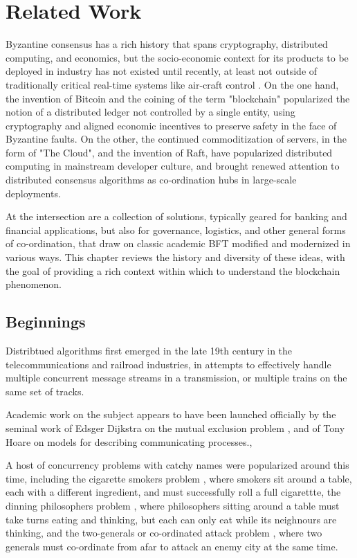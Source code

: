 \chapter{Related Work}
\label{ch:related}

Byzantine consensus has a rich history that spans cryptography, distributed computing, and economics,
but the socio-economic context for its products to be deployed in industry has not existed until recently,
at least not outside of traditionally critical real-time systems like air-craft control \cite{draper_lab}.
On the one hand, the invention of Bitcoin and the coining of the term "blockchain" popularized the notion
of a distributed ledger not controlled by a single entity, using cryptography and aligned economic incentives to 
preserve safety in the face of Byzantine faults.
On the other, the continued commoditization of servers, in the form of "The Cloud", and the invention of Raft, 
have popularized distributed computing in mainstream developer culture, 
and brought renewed attention to distributed consensus algorithms as co-ordination hubs in large-scale deployments. 

At the intersection are a collection of solutions, typically geared for banking and financial applications,
but also for governance, logistics, and other general forms of co-ordination, 
that draw on classic academic BFT modified and modernized in various ways.
This chapter reviews the history and diversity of these ideas, with the goal of providing a rich context within which to 
understand the blockchain phenomenon.

\section{Beginnings}

Distribtued algorithms first emerged in the late 19th century in the telecommunications and railroad industries,
in attempts to effectively handle multiple concurrent message streams in a transmission, 
or multiple trains on the same set of tracks.

Academic work on the subject appears to have been launched officially by the seminal work
of Edsger Dijkstra on the mutual exclusion problem \cite{mutex}, and of Tony Hoare on models for describing communicating processes.\cite{csp}, 

A host of concurrency problems with catchy names were popularized around this time,
including the cigarette smokers problem \cite{cigarette_smokers}, where smokers sit around a table, 
each with a different ingredient, and must successfully roll a full cigarettte,
the dinning philosophers problem \cite{dining_philosophers},
where philosophers sitting around a table must take turns eating and thinking,
but each can only eat while its neighnours are thinking,
and the two-generals or co-ordinated attack problem \cite{gettier},
where two generals must co-ordinate from afar to attack an enemy city at the same time.

